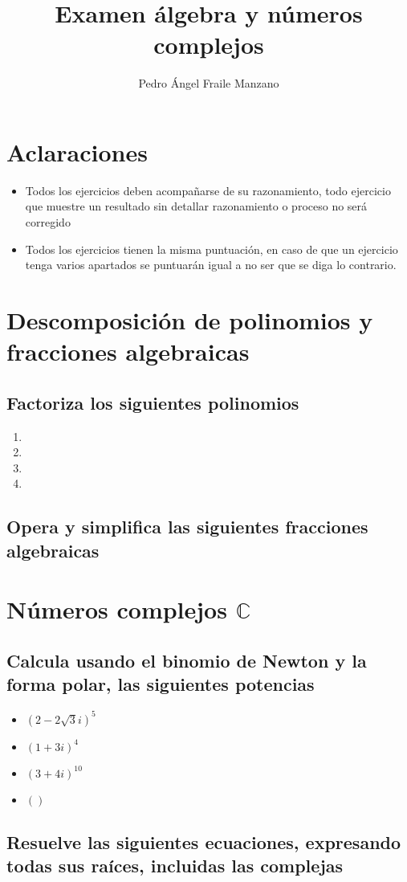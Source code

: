 \documentclass[11pt,a4paper]{article}
\title{Examen álgebra y números complejos}
\author{Pedro Ángel Fraile Manzano }
\begin{document}
\maketitle
\section*{Aclaraciones}
\begin{itemize}
\item Todos los ejercicios deben acompañarse de su razonamiento, todo ejercicio que muestre un resultado sin detallar razonamiento o proceso no será corregido
\item Todos los ejercicios tienen la misma puntuación, en caso de que un ejercicio tenga varios apartados se puntuarán igual a no ser que se diga lo contrario. 
\end{itemize}

\section{Descomposición de polinomios y fracciones algebraicas}
\subsection{Factoriza los siguientes polinomios}
\begin{enumerate}
\item
\item
\item
\item
\end{enumerate}
\subsection{Opera y simplifica las siguientes fracciones algebraicas}
\section{Números complejos $\mathbb{C}$}
\subsection{Calcula usando el binomio de Newton y la forma polar, las siguientes potencias}
\begin{itemize}
\item $(2-2\sqrt{3}i)^5$
\item $(1+3i)^4$
\item $(3+4i)^10$
\item $()$
\end{itemize}
\subsection{Resuelve las siguientes ecuaciones, expresando todas sus raíces, incluidas las complejas}
\end{document}
